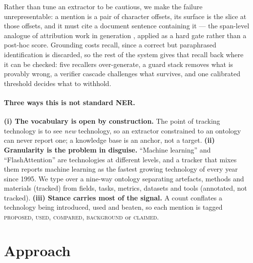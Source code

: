 \documentclass[11pt]{article}
\begin{document}
Rather than tune an extractor to be cautious, we make the failure
unrepresentable: a mention is a pair of character offsets, its surface is the
slice at those offsets, and it must cite a document sentence containing it --- the
span-level analogue of attribution work in generation
\cite{rashkin2023attribution}, applied as a hard gate rather than a post-hoc
score. Grounding costs recall, since a correct but paraphrased identification is
discarded, so the rest of the system gives that recall back where it can be
checked: five recallers over-generate, a guard stack removes what is provably
wrong, a verifier cascade challenges what survives, and one calibrated threshold
decides what to withhold.

\paragraph{Three ways this is not standard NER.}
\textbf{(i) The vocabulary is open by construction.} The point of tracking
technology is to see \emph{new} technology, so an extractor constrained to an
ontology can never report one; a knowledge base is an anchor, not a target.
\textbf{(ii) Granularity is the problem in disguise.} ``Machine learning'' and
``FlashAttention'' are technologies at different levels, and a tracker that mixes
them reports machine learning as the fastest growing technology of every year
since 1995. We type over a nine-way ontology separating artefacts, methods and
materials (tracked) from fields, tasks, metrics, datasets and tools (annotated,
not tracked).
\textbf{(iii) Stance carries most of the signal.} A count conflates a technology
being introduced, used and beaten, so each mention is tagged \textsc{proposed},
\textsc{used}, \textsc{compared}, \textsc{background} or \textsc{claimed}.

\section{Approach}

\begin{table}[t]
\centering\footnotesize\setlength{\tabcolsep}{4.5pt}

\caption{All eleven configurations, offline tier. Baselines are components of this
system with the guard stack reduced to grounding. Every row has hallucination rate
\RFullHalluc. The strict/partial gap measures boundary disagreement, not failure
to find the technology; AURC is lower-is-better.}
\label{tab:results}
\end{table}
\end{document}
